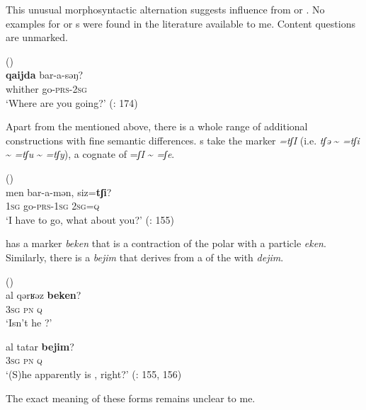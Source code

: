\noindent This unusual morphosyntactic alternation suggests influence from  or . No examples for  or s were found in the literature available to me. Content questions are unmarked.

\ea%
    \label{ex:turk:22}
     ()\\
    \gll \textbf{{qaijda}} bar-a-səŋ?\\
    whither  go-\textsc{prs}-2\textsc{sg}\\
    \glt ‘Where are you going?’ (\citealt{HuZhenhua1986}: 174)
    \z

Apart from the  mentioned above, there is a whole range of additional constructions with fine semantic differences. s take the marker \textit{=tʃI} (i.e. \textit{tʃə} {\textasciitilde} \textit{=tʃi} {\textasciitilde} \textit{=tʃu} {\textasciitilde} \textit{=tʃy}), a cognate of  =\textit{ʃI} {\textasciitilde} \textit{=ʃe}.

\ea%
    \label{ex:turk:23}
     ()\\
    \gll men  bar-a-mən,  siz=\textbf{{tʃi}}?\\
    1\textsc{sg}  go-\textsc{prs}-1\textsc{sg}  2\textsc{sg}=\textsc{q}\\
    \glt ‘I have to go, what about you?’ (\citealt{HuZhenhua1986}: 155)
    \z

 has a marker \textit{beken} that is a contraction of the polar  with a particle \textit{eken}. Similarly, there is a  \textit{bejim} that derives from a  of the  with \textit{dejim}.

\ea%
    \label{ex:turk:24}
     ()\\
    \ea
    \gll al  qərʁəz \textbf{{beken}}?\\
    3\textsc{sg}  \textsc{pn}    \textsc{q}\\
    \glt ‘Isn’t he ?’
    
    \ex
    \gll al  tatar \textbf{{bejim}}?\\
    3\textsc{sg}  \textsc{pn}    \textsc{q}\\
    \glt ‘(S)he apparently is , right?’ (\citealt{HuZhenhua1986}: 155, 156)
    \z
    \z

\noindent The exact meaning of these forms remains unclear to me.

